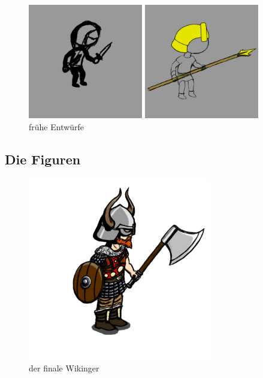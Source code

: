 \documentclass[extern,palatino]{cgBA}
\begin{document}
\begin{figure}
	\raggedleft
	\includegraphics[width=5cm]{assachibi.jpg}
	\raggedright
	\includegraphics[width=5cm]{egychibi.jpg}
	\caption{frühe Entwürfe}
\end{figure}
\subsection{Die Figuren}
\begin{figure}
	\centering
	\includegraphics[height=8cm]{viking.jpg}
	\caption{der finale Wikinger}
\end{figure}
\end{document}
